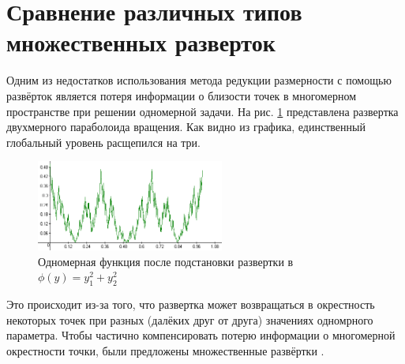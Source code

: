 \section{Сравнение различных типов множественных разверток}
  Одним из недостатков использования метода редукции размерности с помощью развёрток является потеря информации о близости точек в многомерном пространстве при
  решении одномерной задачи. На рис. \ref{fig:paraboloid} представлена развертка двухмерного параболоида вращения. Как видно из графика, единственный глобальный уровень расщепился на три.
  \begin{figure}[ht]
  	\center
    \includegraphics[width=0.55\textwidth]{pictures/map_paraboloid.png}
    \caption{Одномерная функция после подстановки развертки в \(\phi(y)=y_1^2+y_2^2\)}
    \label{fig:paraboloid}
  \end{figure}
   Это происходит из-за того, что развертка может возвращаться в окрестность некоторых точек при разных (далёких друг от друга) значениях одномрного параметра.
   Чтобы частично компенсировать потерю информации о многомерной окрестности точки, были предложены множественные развёртки \cite{shiftedEvolvents, rotatedEvolvents}.
